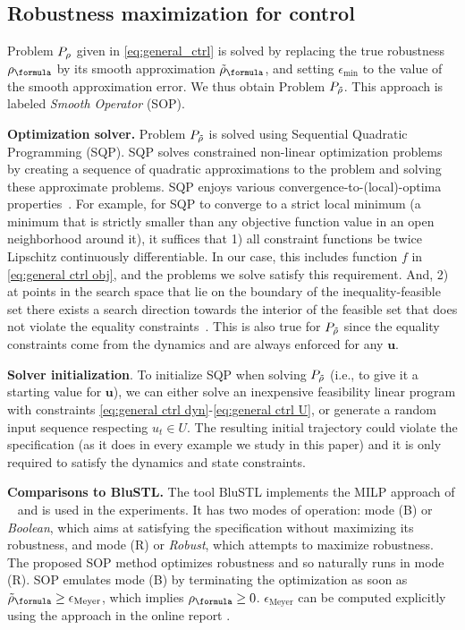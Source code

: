 \subsection{Robustness maximization for control}
\label{sec:toy example}
Problem $P_\rho$ given in \eqref{eq:general_ctrl} is solved by replacing the true robustness $\robf$ by its smooth approximation $\srobf$, and setting $\epsilon_{\text{min}}$ to the value of the smooth approximation error.
We thus obtain Problem $P_{\tilde{\rho}}$. 
This approach is labeled \textit{Smooth Operator} (SOP).

\textbf{Optimization solver.}
Problem $P_{\tilde{\rho}}$ is solved using Sequential Quadratic Programming (SQP).
SQP solves constrained non-linear optimization problems by creating a sequence of quadratic approximations to the problem and solving these approximate problems.
SQP enjoys various convergence-to-(local)-optima properties~\cite[Section 2.9]{Polak97_Optim}.
For example, for SQP to converge to a strict local minimum (a minimum that is strictly smaller than any objective function value in an open neighborhood around it), it suffices that 
1) all constraint functions be twice Lipschitz continuously differentiable. 
In our case, this includes function $f$ in \eqref{eq:general ctrl obj}, and the problems we solve satisfy this requirement.
And, 
2) at points in the search space that lie on the boundary of the inequality-feasible set
there exists a search direction towards the interior of the feasible set that does not violate the equality constraints~\cite[Assumption 2.9.1]{Polak97_Optim}. 
This is also true for $P_{\tilde{\rho}}$ since the equality constraints come from the dynamics and are always enforced for any $\mathbf{u}$.

\textbf{Solver initialization}.
To initialize SQP when solving $P_{\tilde{\rho}}$ (i.e., to give it a starting value for $\mathbf{u}$), we can either solve an inexpensive feasibility linear program with constraints \eqref{eq:general ctrl dyn}-\eqref{eq:general ctrl U}, 
or generate a random input sequence respecting $u_t \in U$. 
The resulting initial trajectory could violate the specification (as it does in every example we study in this paper) and it is only required to satisfy the dynamics and state constraints.

\textbf{Comparisons to BluSTL.}
The tool BluSTL implements the MILP approach of ~\cite{Raman14_MPCSTL} and is used in the experiments.
It has two modes of operation: mode (B) or \textit{Boolean}, which aims at satisfying the specification without maximizing its robustness, and mode (R) or \textit{Robust}, which attempts to maximize robustness. 
The proposed SOP method optimizes robustness and so naturally runs in mode (R).
SOP emulates mode (B) by terminating the optimization as soon as $\srobf \geq \epsilon_{\text{Meyer}}$, which implies $\rob_{\formula} \geq 0$. $\epsilon_{\text{Meyer}}$ can be computed explicitly using the approach in the online report \cite{PantAM17_SmoothOpTechRpt}.



%
